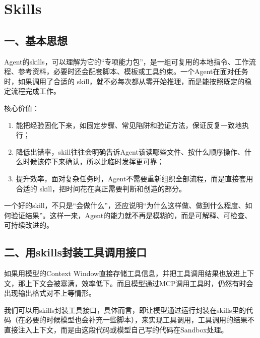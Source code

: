 \setcounter{section}{2}

\hypertarget{skills}{%
\section{Skills}\label{skills}}

\hypertarget{ux4e00ux57faux672cux601dux60f3-2}{%
\subsection{一、基本思想}\label{ux4e00ux57faux672cux601dux60f3-2}}

Agent的skills，可以理解为它的``专项能力包''，是一组可复用的本地指令、工作流程、参考资料，必要时还会配套脚本、模板或工具约束。一个Agent在面对任务时，如果调用了合适的 skill，就不必每次都从零开始推理，而是能按照既定的稳定流程完成工作。

核心价值：

\begin{enumerate}
\def\labelenumi{\arabic{enumi}.}
\item
  能把经验固化下来，如固定步骤、常见陷阱和验证方法，保证反复一致地执行；
\item
  降低出错率，skill往往会明确告诉Agent该读哪些文件、按什么顺序操作、什么时候该停下来确认，所以比临时发挥更可靠；
\item
  提升效率，面对复杂任务时，Agent不需要重新组织全部流程，而是直接套用合适的 skill，把时间花在真正需要判断和创造的部分。
\end{enumerate}

一个好的skill，不只是``会做什么''，还应说明``为什么这样做、做到什么程度、如何验证结果''。这样一来，Agent的能力就不再是模糊的，而是可解释、可检查、可持续改进的。

\hypertarget{ux4e8cux7528skillsux5c01ux88c5ux5de5ux5177ux8c03ux7528ux63a5ux53e3}{%
\subsection{二、用skills封装工具调用接口}\label{ux4e8cux7528skillsux5c01ux88c5ux5de5ux5177ux8c03ux7528ux63a5ux53e3}}

如果用模型的Context Window直接存储工具信息，并把工具调用结果也放进上下文，那上下文会被塞满，效率低下。而且模型通过MCP调用工具时，仍然有时会出现输出格式对不上等情形。

我们可以用skills封装工具接口，具体而言，即让模型通过运行封装在skills里的代码（在必要的时候模型也会补充一些脚本），来实现工具调用，工具调用的结果不直接注入上下文，而是由这段代码或模型自己写的代码在Sandbox处理。

